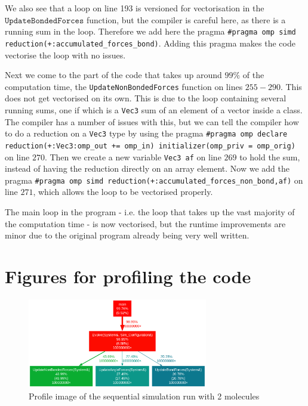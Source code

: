 \documentclass{article}
\begin{document}
We also see that a loop on line 193 is versioned for vectorisation in the $\texttt{UpdateBondedForces}$ function, but the compiler is careful here, as there is a running sum in the loop. Therefore we add here the pragma \texttt{\#pragma omp simd reduction(+:accumulated\_forces\_bond)}. Adding this pragma makes the code vectorise the loop with no issues.

Next we come to the part of the code that takes up around $99\%$ of the computation time, the \texttt{UpdateNonBondedForces} function on lines $255-290$. This does not get vectorised on its own. This is due to the loop containing several running sums, one if which is a \texttt{Vec3} sum of an element of a vector inside a class. The compiler has a number of issues with this, but we can tell the compiler how to do a reduction on a \texttt{Vec3} type by using the pragma \texttt{\#pragma omp declare reduction(+:Vec3:omp\_out += omp\_in) initializer(omp\_priv = omp\_orig)} on line $270$. Then we create a new variable \texttt{Vec3 af} on line $269$ to hold the sum, instead of having the reduction directly on an array element. Now we add the pragma \texttt{\#pragma omp simd reduction(+:accumulated\_forces\_non\_bond,af)} on line $271$, which allows the loop to be vectorised properly. 

The main loop in the program - i.e. the loop that takes up the vast majority of the computation time - is now vectorised, but the runtime improvements are minor due to the original program already being very well written.
\newpage
\appendix
\section*{Figures for profiling the code}
\FloatBarrier
\begin{figure}
    \includegraphics[width=0.7\textwidth]{Images/seq_2mol_profile.png
    }
    \centering
    \caption{Profile image of the sequential simulation run with 2 molecules}
    \label{fig: seq profile 2 molecule}
\end{figure}
\end{document}
